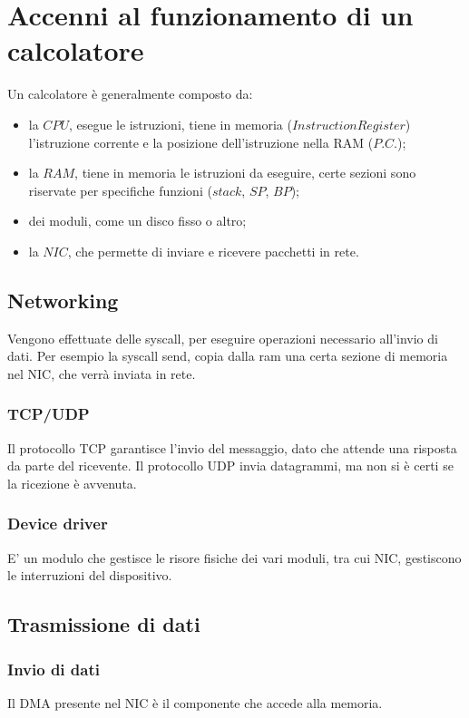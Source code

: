 \chapter{Accenni al funzionamento di un calcolatore}
Un calcolatore è generalmente composto da:
\begin{itemize}
  \item la $CPU$, esegue le istruzioni, tiene in memoria ($Instruction Register$)
    l'istruzione corrente e la posizione dell'istruzione nella RAM ($P.C.$);
  \item la $RAM$, tiene in memoria le istruzioni da eseguire, certe sezioni
    sono riservate per specifiche funzioni ($stack$, $SP$, $BP$);
  \item dei moduli, come un disco fisso o altro;
  \item la $NIC$, che permette di inviare e ricevere pacchetti in rete.
\end{itemize}

\section{Networking}
Vengono effettuate delle syscall, per eseguire operazioni necessario all'invio
di dati.
Per esempio la syscall send, copia dalla ram una certa sezione di memoria nel
NIC, che verrà inviata in rete.

\subsection{TCP/UDP}
Il protocollo TCP garantisce l'invio del messaggio, dato che attende una
risposta da parte del ricevente.
Il protocollo UDP invia datagrammi, ma non si è certi se la ricezione è
avvenuta.

\subsection{Device driver}
E' un modulo che gestisce le risore fisiche dei vari moduli, tra cui NIC,
gestiscono le interruzioni del dispositivo.

\section{Trasmissione di dati}
\subsection{Invio di dati}
Il DMA presente nel NIC è il componente che accede alla memoria.

